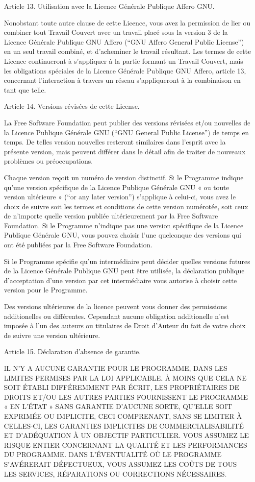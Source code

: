 {Article 13. Utilisation avec la Licence Générale Publique Affero GNU.

Nonobstant toute autre clause de cette Licence, vous avez la permission
de lier ou combiner tout Travail Couvert avec un travail placé sous la
version 3 de la Licence Générale Publique GNU Affero (“GNU Affero
General Public License”) en un seul travail combiné, et d’acheminer le
travail résultant. Les termes de cette Licence continueront à
s’appliquer à la partie formant un Travail Couvert, mais les
obligations spéciales de la Licence Générale Publique GNU Affero,
article 13, concernant l’interaction à travers un réseau s’appliqueront
à la combinaison en tant que telle.


Article 14. Versions révisées de cette License.

La Free Software Foundation peut publier des versions révisées et/ou
nouvelles de la Licence Publique Générale GNU (“GNU General Public
License”) de temps en temps. De telles version nouvelles resteront
similaires dans l’esprit avec la présente version, mais peuvent
différer dans le détail afin de traiter de nouveaux problèmes ou
préoccupations.

Chaque version reçoit un numéro de version distinctif. Si le Programme
indique qu’une version spécifique de la Licence Publique Générale GNU
« ou toute version ultérieure » (“or any later version”) s’applique à
celui-ci, vous avez le choix de suivre soit les termes et conditions de
cette version numérotée, soit ceux de n’importe quelle version publiée
ultérieurement par la Free Software Foundation. Si le Programme
n’indique pas une version spécifique de la Licence Publique Générale
GNU, vous pouvez choisir l’une quelconque des versions qui ont été
publiées par la Free Software Foundation.

Si le Programme spécifie qu’un intermédiaire peut décider quelles
versions futures de la Licence Générale Publique GNU peut être
utilisée, la déclaration publique d’acceptation d’une version par cet
intermédiaire vous autorise à choisir cette version pour le Programme.

Des versions ultérieures de la licence peuvent vous donner des
permissions additionelles ou différentes. Cependant aucune obligation
additionelle n’est imposée à l’un des auteurs ou titulaires de Droit
d’Auteur du fait de votre choix de suivre une version ultérieure.


Article 15. Déclaration d’absence de garantie.

IL N’Y A AUCUNE GARANTIE POUR LE PROGRAMME, DANS LES LIMITES PERMISES
PAR LA LOI APPLICABLE. À MOINS QUE CELA NE SOIT ÉTABLI DIFFÉREMMENT PAR
ÉCRIT, LES PROPRIÉTAIRES DE DROITS ET/OU LES AUTRES PARTIES FOURNISSENT
LE PROGRAMME « EN L’ÉTAT » SANS GARANTIE D’AUCUNE SORTE, QU’ELLE SOIT
EXPRIMÉE OU IMPLICITE, CECI COMPRENANT, SANS SE LIMITER À CELLES-CI,
LES GARANTIES IMPLICITES DE COMMERCIALISABILITÉ ET D’ADÉQUATION À UN
OBJECTIF PARTICULIER. VOUS ASSUMEZ LE RISQUE ENTIER CONCERNANT LA
QUALITÉ ET LES PERFORMANCES DU PROGRAMME. DANS L’ÉVENTUALITÉ OÙ LE
PROGRAMME  S’AVÉRERAIT DÉFECTUEUX, VOUS ASSUMEZ
LES COÛTS DE TOUS LES SERVICES, RÉPARATIONS OU CORRECTIONS NÉCESSAIRES.


}
